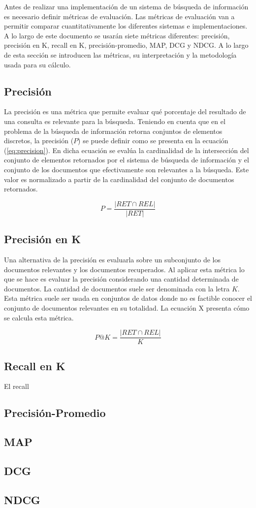 Antes de realizar una implementación de un sistema de búsqueda de información es necesario definir métricas de evaluación. Las métricas de evaluación van a permitir comparar cuantitativamente los diferentes sistemas e implementaciones. A lo largo de este documento se usarán siete métricas diferentes: precisión, precisión en K, recall en K, precisión-promedio, MAP, DCG y NDCG. A lo largo de esta sección se introducen las métricas, su interpretación y la metodología usada para su cálculo. 

\subsection{Precisión}
La precisión es una métrica que permite evaluar qué porcentaje del resultado de una consulta es relevante para la búsqueda. Teniendo en cuenta que en el problema de la búsqueda de información retorna conjuntos de elementos discretos, la precisión ($P$) se puede definir como se presenta en la ecuación (\ref{eq:precision}). En dicha ecuación se evalúa la cardinalidad de la intersección del conjunto de elementos retornados por el sistema de búsqueda de información y el conjunto de los documentos que efectivamente son relevantes a la búsqueda. Este valor es normalizado a partir de la cardinalidad del conjunto de documentos retornados.

\begin{equation}
    P = \frac{|RET \cap REL|}{|RET|}
    \label{eq:precision}
\end{equation}

\subsection{Precisión en K}
Una alternativa de la precisión es evaluarla sobre un subconjunto de los documentos relevantes y los documentos recuperados. Al aplicar esta métrica lo que se hace es evaluar la precisión considerando una cantidad determinada de documentos. La cantidad de documentos suele ser denominada con la letra $K$. Esta métrica suele ser usada en conjuntos de datos donde no es factible conocer el conjunto de documentos relevantes en su totalidad. La ecuación X presenta cómo se calcula esta métrica.

\begin{equation}
    P@K = \frac{|RET \cap REL|}{K}
\end{equation}

\subsection{Recall en K}
El recall 

\subsection{Precisión-Promedio}

\subsection{MAP}

\subsection{DCG}

\subsection{NDCG}
